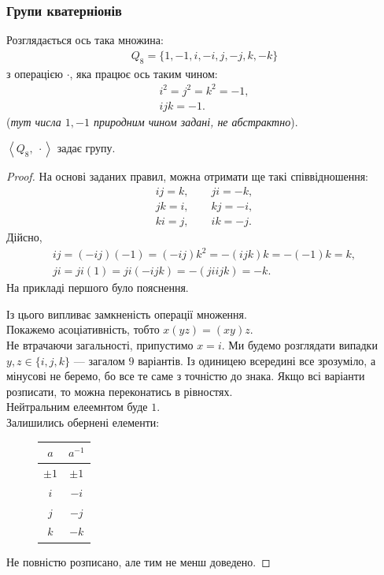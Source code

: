 \documentclass{math_library}
\begin{document}
\subsubsection{Групи кватерніонів}
Розглядається ось така множина:
\begin{align*}
Q_8 = \{1,-1,i,-i,j,-j,k,-k\}
\end{align*}
з операцією $\cdot$, яка працює ось таким чином:
\begin{align*}
i^2 = j^2 = k^2 = -1, \\
ijk = -1.
\end{align*}
(\textit{тут числа $1,-1$ природним чином задані, не абстрактно}).

\begin{theorem}
$\left<Q_8,\ \cdot \right>$ задає групу.
\end{theorem}

\begin{proof}
На основі заданих правил, можна отримати ще такі співвідношення:
\begin{align*}
ij = k, \qquad ji = -k, \\
jk = i, \qquad kj = -i, \\
ki = j, \qquad ik = -j.
\end{align*}
Дійсно,
\begin{align*}
ij = (-ij) (-1) = (-ij) k^2 = -(ijk)k = -(-1)k = k, \\
ji = ji (1) = ji (-ijk) = -(ji ijk) = -k.
\end{align*}
На прикладі першого було пояснення.
\begin{figure}[H]
\centering
{}
\end{figure}
Із цього випливає замкненість операції множення.\\
Покажемо асоціативність, тобто $x(yz) = (xy)z$.\\
Не втрачаючи загальності, припустимо $x = i$. Ми будемо розглядати випадки $y,z \in \{i,j,k\}$ --- загалом $9$ варіантів. Із одиницею всередині все зрозуміло, а мінусові не беремо, бо все те саме з точністю до знака. Якщо всі варіанти розписати, то можна переконатись в рівностях.\\
Нейтральним елеемнтом буде $1$.\\
Залишились обернені елементи:
\begin{figure}[H]
\centering
\begin{tabular}{c|c}
$a$ & $a^{-1}$ \\
\hline
$\pm 1$ & $\pm 1$ \\
$i$ & $-i$ \\
$j$ & $-j$ \\
$k$ & $-k$
\end{tabular}
\end{figure}
Не повністю розписано, але тим не менш доведено.
\end{proof}
\end{document}
